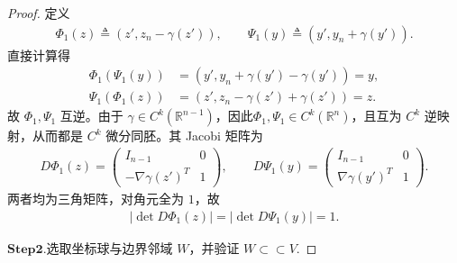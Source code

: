 \documentclass[../../main.tex]{subfiles}
\begin{document}
\begin{proof}
定义
\begin{align*}
\Phi_1(z)\triangleq\left(z',z_n-\gamma(z')\right),\qquad
\Psi_1(y)\triangleq\left(y',y_n+\gamma(y')\right).
\end{align*}
直接计算得
\begin{align*}
\Phi_1(\Psi_1(y))&=\left(y',y_n+\gamma(y')-\gamma(y')\right)=y,\\
\Psi_1(\Phi_1(z))&=\left(z',z_n-\gamma(z')+\gamma(z')\right)=z.
\end{align*}
故 $\Phi_1,\Psi_1$ 互逆。由于 $\gamma\in C^{k}(\mathbb{R}^{n-1})$，因此$\Phi_1,\Psi_1\in C^{k}(\mathbb{R}^{n})$，且互为 $C^{k}$ 逆映射，从而都是 $C^{k}$ 微分同胚。其 Jacobi 矩阵为
\begin{align*}
D\Phi_1(z)=
\begin{pmatrix}
I_{n-1} & 0\\
-\nabla\gamma(z')^{T} & 1
\end{pmatrix},
\qquad
D\Psi_1(y)=
\begin{pmatrix}
I_{n-1} & 0\\
\nabla\gamma(y')^{T} & 1
\end{pmatrix}.
\end{align*}
两者均为三角矩阵，对角元全为 $1$，故
\begin{align}
|\det D\Phi_1(z)|=|\det D\Psi_1(y)|=1.
\label{eq:ch05-统一-det1}
\end{align}

\noindent$\mathbf{Step}\bm{2}$.{\heiti 选取坐标球与边界邻域 $W$，并验证 $W\subset\subset V$.}


\end{proof}
\end{document}
